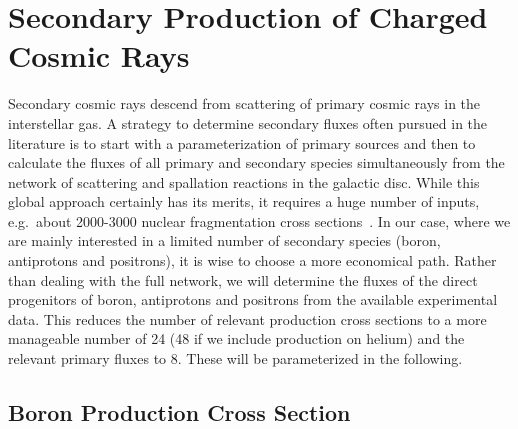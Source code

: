 \documentclass[a4paper,11pt]{article}
\begin{document}
\section{Secondary Production of Charged Cosmic Rays}\label{sec:secondaryproduction}

Secondary cosmic rays descend from scattering of primary cosmic rays in the interstellar gas. A strategy to determine secondary fluxes often pursued in the literature is to start with a parameterization of primary sources and then to calculate the fluxes of all primary and secondary species simultaneously from the network of scattering and spallation reactions in the galactic disc. While this global approach certainly has its merits, it requires a huge number of inputs, e.g.\ about 2000-3000 nuclear fragmentation cross sections~\cite{Webber:2003}. In our case, where we are mainly interested in a limited number of secondary species (boron, antiprotons and positrons), it is wise to choose a more economical path.
Rather than dealing with the full network, we will determine the fluxes of the direct progenitors of boron, antiprotons and positrons from the available experimental data.
This reduces the number of relevant production cross sections to a more manageable number of 24 (48 if we include production on helium) and the relevant primary fluxes to 8. These will be parameterized in the following.

\subsection{Boron Production Cross Section}\label{sec:boronproduction}
\end{document}
